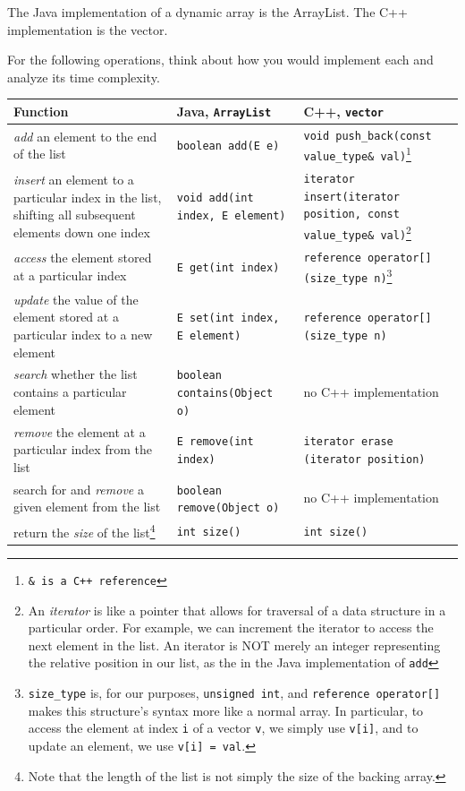 The Java implementation of a dynamic array is the ArrayList. The C++ implementation is the vector.

For the following operations, think about how you would implement each and analyze its time complexity. 

\begin{center}
    \begin{tabular}{ p{5cm} p{5cm} p{5cm} }
	Function	&	Java, \texttt{ArrayList}	&	C++, \texttt{vector} \\
	\hline
	\textit{add} an element to the end of the list		&	\texttt{boolean add(E e)}	&	\texttt{void push\_back(const value\_type\& val)}\footnote{\texttt{\& is a C++ reference}} \\
	\textit{insert} an element to a particular index in the list, shifting all subsequent elements down one index	&	\texttt{void add(int index, E element)}		&	\texttt{iterator insert(iterator position, const value\_type\& val)}\footnote{An \textit{iterator} is like a pointer that allows for traversal of a data structure in a particular order. For example, we can increment the iterator to access the next element in the list. An iterator is NOT merely an integer representing the relative position in our list, as the in the Java implementation of \texttt{add}}	\\
	\textit{access} the element stored at a particular index	&	\texttt{E get(int index)}		&	\texttt{reference operator[] (size\_type n)}\footnote{\texttt{size\_type} is, for our purposes, \texttt{unsigned int}, and \texttt{reference operator[]} makes this structure's syntax more like a normal array. In particular, to access the element at index \texttt{i} of a vector \texttt{v}, we simply use \texttt{v[i]}, and to update an element, we use \texttt{v[i] = val}.}	\\
	\textit{update} the value of the element stored at a particular index to a new element & \texttt{E set(int index, E element)} & \texttt{reference operator[] (size\_type n)} \\
	\textit{search} whether the list contains a particular element & \texttt{boolean contains(Object o)} & no C++ implementation \\
	\textit{remove} the element at a particular index from the list & \texttt{E remove(int index)} & \texttt{iterator erase (iterator position)} \\
	search for and \textit{remove} a given element from the list & \texttt{boolean remove(Object o)} & no C++ implementation \\
	return the \textit{size} of the list\footnote{Note that the length of the list is not simply the size of the backing array.} & \texttt{int size()} & \texttt{int size()}
    \end{tabular}
\end{center}

